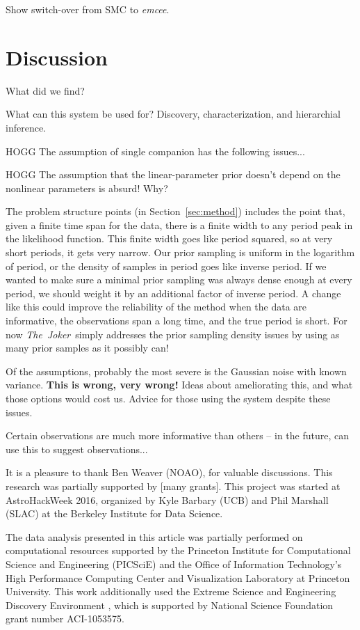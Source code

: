 \documentclass[manuscript, letterpaper]{aastex6}
\newcommand{\project}[1]{\textsl{#1}}
\newcommand{\samplername}{\project{The~Joker}}
\newcommand{\emcee}{\project{emcee}}
\newcommand{\sectionname}{Section}
\begin{document}
Show switch-over from SMC to \emcee.

\section{Discussion} \label{sec:discussion}

What did we find?

What can this system be used for? Discovery, characterization, and
hierarchial inference.

HOGG The assumption of single companion has the following issues...

HOGG The assumption that the linear-parameter prior doesn't depend
on the nonlinear parameters is absurd! Why?

The problem structure points (in \sectionname~\ref{sec:method})
includes the point that, given a finite time span for the data, there
is a finite width to any period peak in the likelihood function.
This finite width goes like period squared, so at very short periods,
it gets very narrow.
Our prior sampling is uniform in the logarithm of period, or the
density of samples in period goes like inverse period.
If we wanted to make sure a minimal prior sampling was always dense
enough at every period, we should weight it by an additional factor of
inverse period.
A change like this could improve the reliability of the method when the data
are informative, the observations span a long time, and the true
period is short.
For now \samplername\ simply addresses the prior sampling density issues
by using as many prior samples as it possibly can!

Of the assumptions, probably the most severe is the Gaussian noise
with known variance. \textbf{This is wrong, very wrong!} Ideas about
ameliorating this, and what those options would cost us. Advice for
those using the system despite these issues.

Certain observations are much more informative than others -- in the future,
can use this to suggest observations...

\acknowledgements
It is a pleasure to thank
  Ben Weaver (NOAO),
for valuable discussions.
This research was partially supported by [many grants].
This project was started at AstroHackWeek 2016, organized by Kyle
Barbary (UCB) and Phil Marshall (SLAC) at the Berkeley Institute for
Data Science.

The data analysis presented in this article was partially performed on
computational resources supported by the Princeton Institute for Computational
Science and Engineering (PICSciE) and the Office of Information Technology's
High Performance Computing Center and Visualization Laboratory at Princeton
University.
This work additionally used the Extreme Science and Engineering Discovery
Environment \citep[XSEDE;][]{Towns:2014}, which is supported by National
Science Foundation grant number ACI-1053575.
\end{document}
